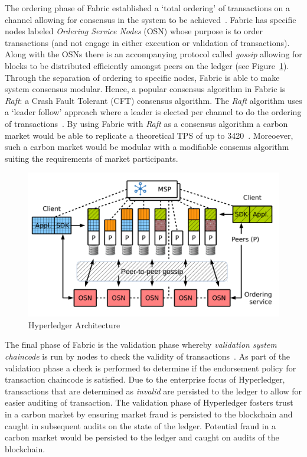 The ordering phase of Fabric established a `total ordering' of transactions
on a channel allowing for consensus in the system to be achieved~\cite{And18}.
Fabric has specific nodes labeled \textit{Ordering Service Nodes} (OSN)
whose purpose is to order transactions (and not engage in either
execution or validation of transactions). Along with the OSNs there
is an accompanying protocol called \textit{gossip} allowing for blocks
to be distributed efficiently amongst peers on the ledger
(see Figure~\ref{fig:harch}). Through the separation of ordering to
specific nodes, Fabric is able to make system consensus modular.
Hence, a popular consensus algorithm in Fabric is \textit{Raft}: a Crash Fault
Tolerant (CFT) consensus algorithm. The \textit{Raft} algorithm uses
a `leader follow' approach where a leader is elected per channel to
do the ordering of transactions~\cite{raft}. By using Fabric with
\textit{Raft} as a consensus algorithm a carbon market would be able
to replicate a theoretical TPS of up to 3420~\cite{And18}. Moreoever,
such a carbon market would be modular with a modifiable consenus
algorithm suiting the requirements of market participants.

\begin{figure}[ht]
    \centering
    \includegraphics[scale=0.4]{photos/hyperarch.png}
    \caption{Hyperledger Architecture}
    \label{fig:harch}
\end{figure}

The final phase of Fabric is the validation phase whereby
\textit{validation system chaincode} is run by nodes to check the
validity of transactions~\cite{And18}. As part of the
validation phase a check is
performed to determine if the endorsement policy for transaction
chaincode is satisfied.
Due to the enterprise focus of Hyperledger, transactions that
are determined as \textit{invalid} are persisted to the ledger to allow
for easier auditing of transaction. The validation phase of Hyperledger
fosters trust in a carbon market by ensuring market fraud is persisted to the
blockchain and caught in subsequent audits on the state of the ledger.
Potential fraud in a carbon market would be persisted to the ledger
and caught on audits of the blockchain.

